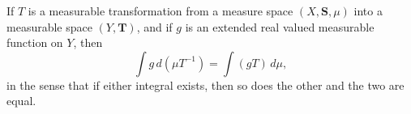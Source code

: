 If $T$ is a measurable transformation from a measure space $(X, \mathbf{S}, \mu)$ into a measurable space $(Y, \mathbf{T})$, and if $g$ is an extended real valued measurable function on $Y$, then
$$\int g \, d(\mu T^{-1}) = \int (gT) \, d\mu,$$
in the sense that if either integral exists, then so does the other and the two are equal.
